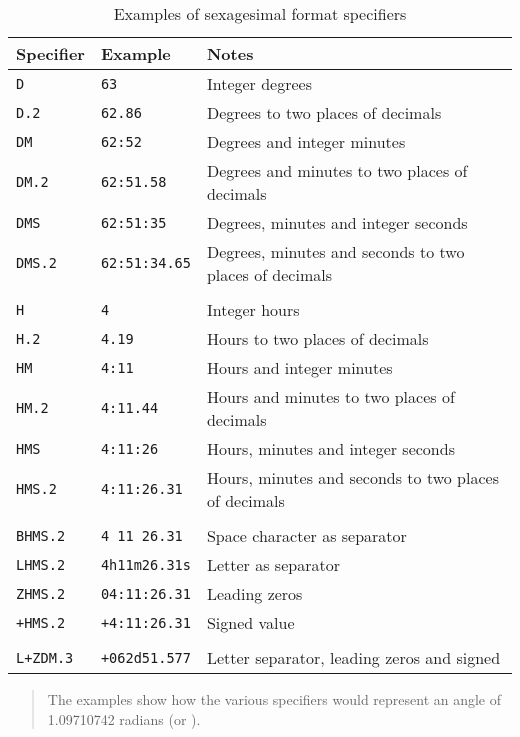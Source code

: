 \begin{table}[htbp]

\begin{center}
\begin{tabular}{lll}
Specifier     & Example            & Notes          \\ \hline
{\tt D}       & {\tt 63}          & Integer degrees \\
{\tt D.2}     & {\tt 62.86}       & Degrees to two places of decimals \\
{\tt DM}      & {\tt 62:52}       & Degrees and integer minutes \\
{\tt DM.2}    & {\tt 62:51.58}    & Degrees and minutes to two places of decimals \\
{\tt DMS}     & {\tt 62:51:35}    & Degrees, minutes and integer seconds \\
{\tt DMS.2}   & {\tt 62:51:34.65} & Degrees, minutes and seconds to two places of decimals \\
              &                    & \\
{\tt H}       & {\tt 4}            & Integer hours \\
{\tt H.2}     & {\tt 4.19}         & Hours to two places of decimals \\
{\tt HM}      & {\tt 4:11}         & Hours and integer minutes \\
{\tt HM.2}    & {\tt 4:11.44}      & Hours and minutes to two places of decimals \\
{\tt HMS}     & {\tt 4:11:26}      & Hours, minutes and integer seconds \\
{\tt HMS.2}   & {\tt 4:11:26.31}   & Hours, minutes and seconds to two places of decimals \\
              &                    & \\
{\tt BHMS.2}  & {\tt 4 11 26.31}   & Space character as separator \\
{\tt LHMS.2}  & {\tt 4h11m26.31s}  & Letter as separator \\
{\tt ZHMS.2}  & {\tt 04:11:26.31}  & Leading zeros \\
{\tt +HMS.2}  & {\tt +4:11:26.31}  & Signed value \\
              &                    & \\
{\tt L+ZDM.3} & {\tt +062d51.577}  & Letter separator, leading zeros and signed \\
\end{tabular}

\begin{quote}
The examples show how the various specifiers would represent an angle of
1.09710742 radians (or ).
\end{quote}

\caption{\label{SEXAG_EXAM}Examples of sexagesimal format specifiers}
\end{center}

\end{table}

